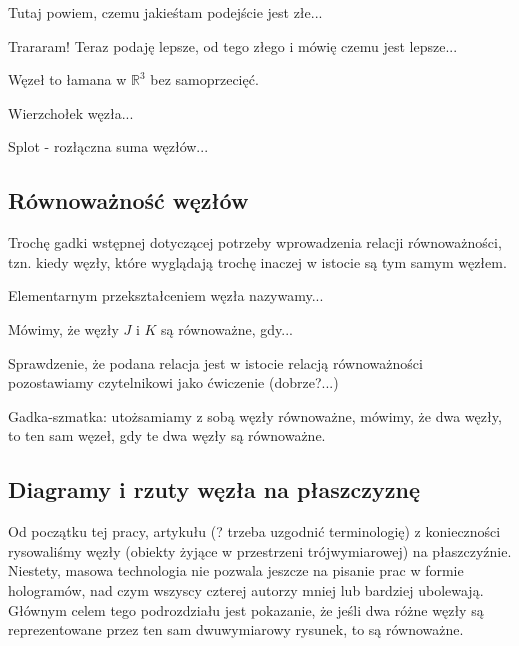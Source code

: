 Tutaj powiem, czemu jakieśtam podejście jest złe...

Trararam! Teraz podaję lepsze, od tego złego i mówię czemu jest lepsze...

\begin{definicja}
 Węzeł to łamana w $\mathbb{R}^3$ bez samoprzecięć.
\end{definicja}

\begin{definicja}
 Wierzchołek węzła...
\end{definicja}

\begin{definicja}
 Splot - rozłączna suma węzłów...
\end{definicja}

\subsection{Równoważność węzłów}
Trochę gadki wstępnej dotyczącej potrzeby wprowadzenia relacji równoważności, tzn. kiedy węzły, które wyglądają trochę inaczej w istocie są tym samym węzłem.


\begin{definicja}
 Elementarnym przekształceniem węzła nazywamy...
\end{definicja}

\begin{definicja}
 Mówimy, że węzły $J$ i $K$ są równoważne, gdy...
\end{definicja}

Sprawdzenie, że podana relacja jest w istocie relacją równoważności pozostawiamy czytelnikowi jako ćwiczenie (dobrze?...)

Gadka-szmatka: utożsamiamy z sobą węzły równoważne, mówimy, że dwa węzły, to ten sam węzeł, gdy te dwa węzły są równoważne.

\subsection{Diagramy i rzuty węzła na płaszczyznę}
Od początku tej pracy, artykułu (? trzeba uzgodnić terminologię) z konieczności rysowaliśmy węzły (obiekty żyjące w przestrzeni trójwymiarowej) na płaszczyźnie. 
Niestety, masowa technologia nie pozwala jeszcze na  pisanie prac w formie hologramów, nad czym wszyscy czterej autorzy mniej lub bardziej ubolewają. Głównym celem
tego podrozdziału jest pokazanie, że jeśli dwa różne węzły są reprezentowane przez ten sam dwuwymiarowy rysunek, to są równoważne.

